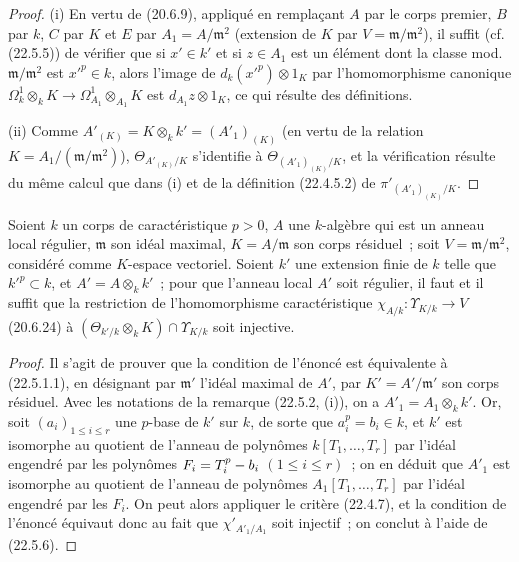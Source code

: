 \begin{proof}
(i) En vertu de (20.6.9), appliqué en remplaçant $A$ par le corps premier, $B$
par $k$, $C$ par $K$ et $E$ par $A_1=A/\mathfrak m^2$ (extension de $K$ par
$V=\mathfrak m/\mathfrak m^2$), il suffit (cf. (22.5.5)) de vérifier que si
$x'\in k'$ et si $z\in A_1$ est un élément dont la classe mod.
$\mathfrak m/\mathfrak m^2$ est $x'^p\in k$, alors l'image de
$d_k(x'^p)\otimes1_K$ par l'homomorphisme canonique
$\Omega^1_k\otimes_kK\longrightarrow\Omega^1_{A_1}\otimes_{A_1}K$ est
$d_{A_1}z\otimes1_K$, ce qui résulte des définitions.

(ii) Comme $A'_{(K)}=K\otimes_kk'=(A'_1)_{(K)}$ (en vertu de la relation
$K=A_1/(\mathfrak m/\mathfrak m^2)$), $\Theta_{A'_{(K)}/K}$ s'identifie à
$\Theta_{(A'_1)_{(K)}/K}$, et la vérification résulte du même calcul que dans
(i) et de la définition (22.4.5.2) de $\pi'_{(A'_1)_{(K)}/K}$.
\end{proof}

\begin{proposition}[22.5.7]
\label{0.22.5.7-fr}
Soient $k$ un corps de caractéristique $p>0$, $A$ une $k$-algèbre qui est un
anneau local régulier, $\mathfrak m$ son idéal maximal, $K=A/\mathfrak m$ son
corps résiduel~; soit $V=\mathfrak m/\mathfrak m^2$, considéré comme
$K$-espace vectoriel. Soient $k'$ une extension finie de $k$ telle que
$k'^p\subset k$, et $A'=A\otimes_kk'$~; pour que l'anneau local $A'$ soit
régulier, il faut et il suffit que la restriction de l'homomorphisme
caractéristique $\chi_{A/k}:\Upsilon_{K/k}\longrightarrow V$ \textup{(20.6.24)} à
$(\Theta_{k'/k}\otimes_kK)\cap\Upsilon_{K/k}$ soit injective.
\end{proposition}

\begin{proof}
Il s'agit de prouver que la condition de l'énoncé est équivalente à
(22.5.1.1), en désignant par $\mathfrak m'$ l'idéal maximal de $A'$, par
$K'=A'/\mathfrak m'$ son corps résiduel. Avec les notations de la remarque
(22.5.2, (i)), on a $A'_1=A_1\otimes_kk'$. Or, soit
$(a_i)_{1\leqslant i\leqslant r}$ une $p$-base de $k'$ sur $k$, de sorte que
$a_i^p=b_i\in k$, et $k'$ est isomorphe au quotient de l'anneau de
polynômes $k[T_1,\ldots,T_r]$ par l'idéal engendré par les polynômes
$F_i=T_i^p- b_i$ $(1\leqslant i\leqslant r)$~; on en déduit que $A'_1$ est
isomorphe au quotient de l'anneau de polynômes $A_1[T_1,\ldots,T_r]$ par
l'idéal engendré par les $F_i$. On peut alors appliquer le critère (22.4.7), et
la condition de l'énoncé équivaut donc au fait que $\chi'_{A'_1/A_1}$ soit
injectif~; on conclut à l'aide de (22.5.6).
\end{proof}

